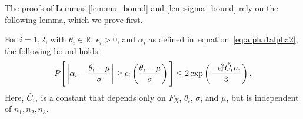 \documentclass[10pt]{article} %
\def\eqref#1{equation~\ref{#1}}
\theoremstyle{plain}
\theoremstyle{definition}
\theoremstyle{remark}
\begin{document}
The proofs of Lemmas \ref{lem:mu_bound} and \ref{lem:sigma_bound} rely on the following lemma, which we prove first.
\begin{lemma}\label{lem:alpha_G_bound}
 For \( i = 1, 2 \), with \( \theta_i \in \mathbb{R},~ \epsilon_i > 0 \), and \( \alpha_i \) as defined in~\eqref{eq:alpha1alpha2}, the following bound holds:
\begin{align}
P \Bigg[ \left| \alpha_i -  \frac{\theta_i - \mu}{\sigma} \right| \geq  \epsilon_i\left(  \frac{\theta_i - \mu }{\sigma}\right)  \Bigg] \leq 2 \exp \left( \frac{- \epsilon_i ^2 \Tilde{C_i} n_i}{3} \right). \notag
\end{align}   
Here, \( \Tilde{C}_i,\) is a constant that depends only on $F_X$, \( \theta_i \), \( \sigma \), and \( \mu \), but is independent of $n_1,n_2,n_3$.
\end{lemma}
\end{document}

